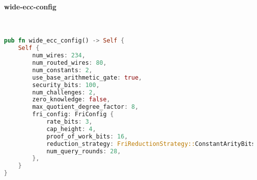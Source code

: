 \paragraph{wide-ecc-config}

\hspace*{\fill} \\
\begin{lstlisting}[language=rust]
pub fn wide_ecc_config() -> Self {
    Self {
        num_wires: 234,
        num_routed_wires: 80,
        num_constants: 2,
        use_base_arithmetic_gate: true,
        security_bits: 100,
        num_challenges: 2,
        zero_knowledge: false,
        max_quotient_degree_factor: 8,
        fri_config: FriConfig {
            rate_bits: 3,
            cap_height: 4,
            proof_of_work_bits: 16,
            reduction_strategy: FriReductionStrategy::ConstantArityBits(4, 5),
            num_query_rounds: 28,
        },
    }
} 
\end{lstlisting}
